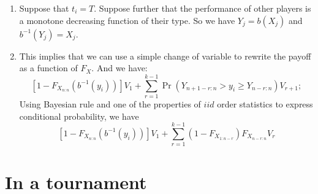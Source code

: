 \documentclass[11pt]{article}
\begin{document}
\begin{enumerate}[label=>>]
\item Suppose that $t_i=T$. Suppose further that the performance of other players is a monotone decreasing function of their type. So we have $Y_j = b(X_j)$ and $b^{-1}(Y_j) = X_j$.

\item This implies that we can use a simple change of variable to rewrite the payoff as a function of $F_X$. And we have:
\[
  [1-F_{X_{n:n}}(b^{-1}(y_i))]V_1 + \sum_{r=1}^{k-1} \Pr(Y_{n+1-r:n} > y_i \geq Y_{n-r:n}) V_{r+1};
\]
Using Bayesian rule and one of the properties of $iid$ order statistics to express conditional probability, we have
\[
  [1-F_{X_{n:n}}(b^{-1}(y_i))]V_1 + \sum_{r=1}^{k-1} (1 - F_{X_{1:n-r}}) F_{X_{n-r:n}} V_r
\]
\end{enumerate}

\section{In a tournament}
\end{document}
